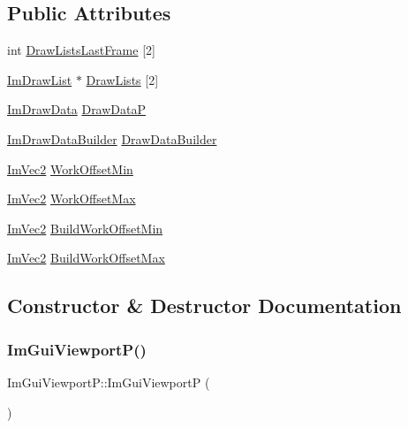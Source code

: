 \subsection*{Public Attributes}
\begin{DoxyCompactItemize}
\item 
int \hyperlink{structImGuiViewportP_afe1bd2a646a004268252aa7109342cb9}{Draw\+Lists\+Last\+Frame} \mbox{[}2\mbox{]}
\item 
\hyperlink{structImDrawList}{Im\+Draw\+List} $\ast$ \hyperlink{structImGuiViewportP_a3c085fe6ef20e07900e767ac60037b38}{Draw\+Lists} \mbox{[}2\mbox{]}
\item 
\hyperlink{structImDrawData}{Im\+Draw\+Data} \hyperlink{structImGuiViewportP_ac3b300ec36e107ad50e0512b4983d3c8}{Draw\+DataP}
\item 
\hyperlink{structImDrawDataBuilder}{Im\+Draw\+Data\+Builder} \hyperlink{structImGuiViewportP_a2969a07813f0112a37975b2096ee1cc7}{Draw\+Data\+Builder}
\item 
\hyperlink{structImVec2}{Im\+Vec2} \hyperlink{structImGuiViewportP_aa01d12e912859fd6edf710ef377ed960}{Work\+Offset\+Min}
\item 
\hyperlink{structImVec2}{Im\+Vec2} \hyperlink{structImGuiViewportP_a7585ac0a2cd88cf8ff77a05567053f2d}{Work\+Offset\+Max}
\item 
\hyperlink{structImVec2}{Im\+Vec2} \hyperlink{structImGuiViewportP_af495c815dcd3a5c81d0dc38e91227292}{Build\+Work\+Offset\+Min}
\item 
\hyperlink{structImVec2}{Im\+Vec2} \hyperlink{structImGuiViewportP_a31343af32e8e6bdab2649e5e6f5ec812}{Build\+Work\+Offset\+Max}
\end{DoxyCompactItemize}


\subsection{Constructor \& Destructor Documentation}
\mbox{\label{structImGuiViewportP_a78fca0422ab2cb3ede3676846d92b6aa}} 
\subsubsection{\texorpdfstring{Im\+Gui\+Viewport\+P()}{ImGuiViewportP()}}
{\footnotesize\ttfamily Im\+Gui\+Viewport\+P\+::\+Im\+Gui\+ViewportP (\begin{DoxyParamCaption}{ }\end{DoxyParamCaption})\hspace{0.3cm}{\ttfamily [inline]}}


